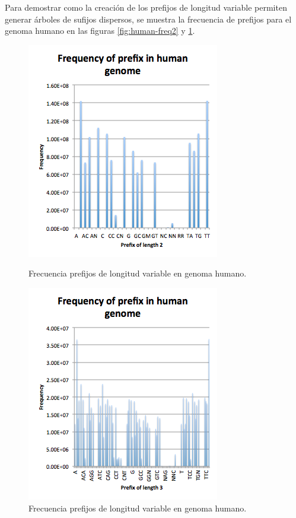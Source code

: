 \documentclass[12pt,a4paper]{article}
\begin{document}
\indent
Para demostrar como la creación de los prefijos de longitud variable permiten generar árboles de sufijos dispersos, se muestra la frecuencia de prefijos para el genoma humano en las figuras \ref{fig:human-freq2} y \ref{fig:human-freq3}.\\
\begin{figure}[!ht]
\begin{minipage}[b]{0.5\linewidth}
\centering
\includegraphics[scale=0.6]{human-freq2.png}
\caption{Frecuencia prefijos de longitud variable en genoma humano.}
\label{fig:human-freq2}
\end{minipage}
\begin{minipage}[b]{0.5\linewidth}
\centering
\includegraphics[scale=0.6]{human-freq3.png}
\caption{Frecuencia prefijos de longitud variable en genoma humano.}
\label{fig:human-freq3}
\end{minipage}
\end{figure}
\end{document}
